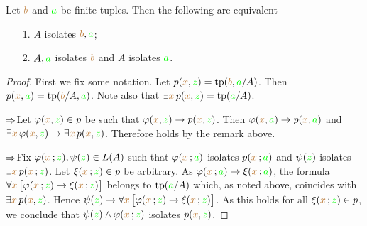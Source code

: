 \documentclass[creche.tex]{subfiles}
\begin{document}

\begin{proposition}
Let ${\mr b}$ and ${\gr a}$ be finite tuples.
Then the following are equivalent
\begin{itemize}
\item[1.] $A$ isolates  ${\mr b},{\gr a}$;
\item[2.] $A,{\gr a}$ isolates ${\mr b}$ and $A$ isolates ${\gr a}$.
\end{itemize}
\end{proposition}
\begin{proof}
First we fix some notation. Let $p({\mr x},{\gr z})=\tp ({\mr b},{\gr a}/A)$. Then  $p({\mr x},{\gr a})=\tp({\mr b}/A,{\gr a})$. Note also that $\E{\mr x}\,p({\mr x},{\gr z})=\tp({\gr a}/A)$.


$\IMP$\quad Let $\phi({\mr x},{\gr z})\in p$ be such that $\phi({\mr x},{\gr z})\imp p({\mr x},{\gr z})$.
Then $\phi({\mr x},{\gr a})\imp p({\mr x},{\gr a})$ and $\E{\mr x}\, \phi({\mr x},{\gr z})\imp \E{\mr x}\,p({\mr x},{\gr z})$.
Therefore  holds by the remark above.

$\IMP$\quad Fix $\phi({\mr x}\,;{\gr z}), \psi({\gr z})\in L(A)$ such that $\phi({\mr x}\,;{\gr a})$ isolates $p({\mr x}\,;{\gr a})$ and $\psi({\gr z})$ isolates $\E {\mr x}\, p({\mr x}\,;{\gr z})$.
Let $\xi({\mr x}\,;{\gr z})\in p$ be arbitrary.
As $\phi({\mr x}\,;{\gr a})\imp\xi({\mr x}\,;{\gr a})$, the formula $\A{\mr x}\,\big[\phi({\mr x}\,;{\gr z})\imp\xi({\mr x}\,;{\gr z})\big]$ belongs to $\tp({\gr a}/A)$ which, as noted above, coincides with $\E {\mr x}\, p({\mr x},{\gr z})$.
Hence $\psi({\gr z})\imp\A{\mr x}\,\big[\phi({\mr x}\,;{\gr z})\imp\xi({\mr x}\,;{\gr z})\big]$.
As this holds for all $\xi({\mr x}\,;{\gr z})\in p$, we conclude that $\psi({\gr z})\wedge\phi({\mr x}\,;{\gr z})$ isolates  $p({\mr x},{\gr z})$.
\end{proof}
\end{document}
